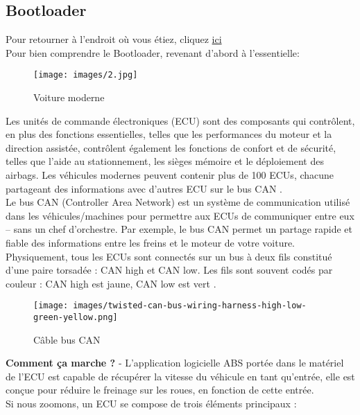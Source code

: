 \documentclass[a4paper, 12pt]{report}
\begin{document}
\subsection{Bootloader}\label{subsec:bootloader} 
Pour retourner à l'endroit où vous étiez, cliquez \hyperref[sec:autoBoot]{ici}\\

Pour bien comprendre le Bootloader, revenant d'abord à l'essentielle: 

\begin{figure}[H]
    \centering
    \texttt{[image: images/2.jpg]}
    \caption{Voiture moderne}
    \label{fig:canBus}
\end{figure}

Les unités de commande électroniques (ECU) sont des composants qui contrôlent, en plus des fonctions essentielles, telles que les performances du moteur et la direction assistée, contrôlent également les fonctions de confort et de sécurité, telles que l'aide au stationnement, les sièges mémoire et le déploiement des airbags. Les véhicules modernes peuvent contenir plus de 100 ECUs, chacune partageant des informations avec d'autres ECU sur le bus CAN \cite{embitel_flash_bootloader}.
\\
Le bus CAN (Controller Area Network) est un système de communication utilisé dans les véhicules/machines pour permettre aux ECUs de communiquer entre eux – sans un chef d'orchestre. Par exemple, le bus CAN permet un partage rapide et fiable des informations entre les freins et le moteur de votre voiture.
\\
Physiquement, tous les ECUs sont connectés sur un bus à deux fils constitué d'une paire torsadée : CAN high et CAN low. Les fils sont souvent codés par couleur : CAN high est jaune, CAN low est vert \cite{entrust_hardware_security_modules}.

\begin{figure}[H]
    \centering
    \texttt{[image: images/twisted-can-bus-wiring-harness-high-low-green-yellow.png]}
    \caption{Câble bus CAN}
    \label{fig:canCable}
\end{figure}


\textbf{Comment ça marche ?} - L'application logicielle ABS portée dans le matériel de l'ECU est capable de récupérer la vitesse du véhicule en tant qu'entrée, elle est conçue pour réduire le freinage sur les roues, en fonction de cette entrée.\\


Si nous zoomons, un ECU se compose de trois éléments principaux :
\end{document}
